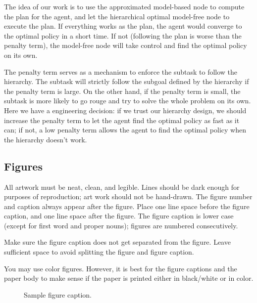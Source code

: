 \documentclass{article} %
\begin{document}


The idea of our work is to use the approximated model-based node to 
compute the plan for the agent, and let the hierarchical optimal model-free node
to execute the plan. If everything works as the plan, the agent would converge to the optimal
policy in a short time. If not (following the plan is worse than the penalty term),
the model-free node will take control and find the optimal policy on its own.

The penalty term serves as a mechanism to enforce the subtask to follow the hierarchy.
The subtask will strictly follow the subgoal defined by the hierarchy if the penalty term is large.
On the other hand, if the penalty term is small, the subtask is more likely to go rouge and try to 
solve the whole problem on its own. Here we have a engineering decision: if we trust our hierarchy design, 
we should increase the penalty term to let the agent find the optimal policy as fast as it can; 
if not, a low penalty term allows the agent to find the optimal policy when the hierarchy doesn't work.


\subsection{Figures}

All artwork must be neat, clean, and legible. Lines should be dark
enough for purposes of reproduction; art work should not be
hand-drawn. The figure number and caption always appear after the
figure. Place one line space before the figure caption, and one line
space after the figure. The figure caption is lower case (except for
first word and proper nouns); figures are numbered consecutively.

Make sure the figure caption does not get separated from the figure.
Leave sufficient space to avoid splitting the figure and figure caption.

You may use color figures. 
However, it is best for the
figure captions and the paper body to make sense if the paper is printed
either in black/white or in color.
\begin{figure}[h]
\begin{center}
\fbox{\rule[-.5cm]{0cm}{4cm} \rule[-.5cm]{4cm}{0cm}}
\end{center}
\caption{Sample figure caption.}
\end{figure}
\end{document}
